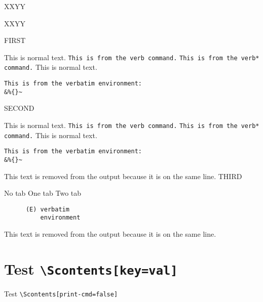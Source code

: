 \documentclass{article}
\begin{document}


XXYY\par
XXYY\par

FIRST\par
This is normal text.
\verb|This is from the verb command.|
\verb*|This is from the verb* command.|    
This is normal text.
\begin{verbatim}
This is from the verbatim environment:
&%{}~
\end{verbatim}

SECOND\par
\begin{scontents}[store-env=newattempt,print-env=false]
This is normal text.
\verb|This is from the verb command.|
\verb*|This is from the verb* command.|    
This is normal text.
\begin{verbatim}
This is from the verbatim environment:
&%{}~
\end{verbatim}
\end{scontents}This text is removed from the output because it is on the same line.
THIRD\par
\begin{scontents}[write-out=withtab.tsc]
No tab
	One tab
		Two tab
\begin{verbatim}
      (E) verbatim
          environment
\end{verbatim}
\end{scontents}This text is removed from the output because it is on the same line.

\section{Test \texttt{\textbackslash Scontents[key=val]}}

Test \verb+\Scontents[print-cmd=false]+\par

\par
\end{document}
